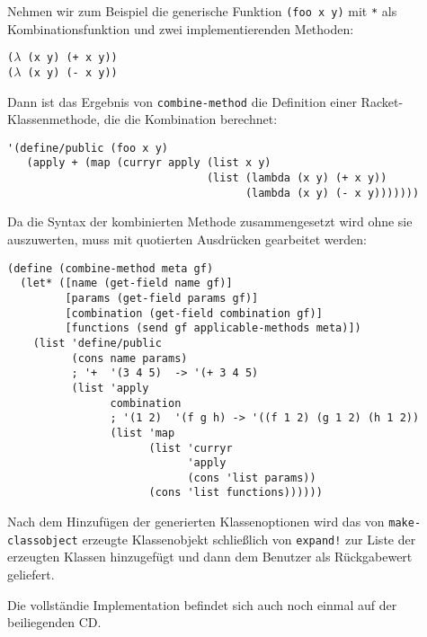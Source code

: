 Nehmen wir zum Beispiel die generische Funktion \texttt{(foo x y)} mit \texttt{*} als Kombinationsfunktion und zwei implementierenden Methoden:

\texttt{($\lambda$ (x y) (+ x y))\\
($\lambda$ (x y) (- x y))}

Dann ist das Ergebnis von \texttt{combine-method} die Definition einer Racket-Klassenmethode, die die Kombination berechnet:

\begin{lstlisting}
'(define/public (foo x y)
   (apply + (map (curryr apply (list x y)
                               (list (lambda (x y) (+ x y))
                                     (lambda (x y) (- x y)))))))
\end{lstlisting}

Da die Syntax der kombinierten Methode zusammengesetzt wird ohne sie auszuwerten, muss mit quotierten Ausdrücken gearbeitet werden:

\begin{lstlisting}
(define (combine-method meta gf)
  (let* ([name (get-field name gf)]
         [params (get-field params gf)]
         [combination (get-field combination gf)]
         [functions (send gf applicable-methods meta)])
    (list 'define/public
          (cons name params)
          ; '+  '(3 4 5)  -> '(+ 3 4 5)
          (list 'apply
                combination
                ; '(1 2)  '(f g h) -> '((f 1 2) (g 1 2) (h 1 2))
                (list 'map
                      (list 'curryr
                            'apply
                            (cons 'list params))
                      (cons 'list functions))))))
\end{lstlisting}

Nach dem Hinzufügen der generierten Klassenoptionen wird das von \texttt{make-classobject} erzeugte Klassenobjekt schließlich von \texttt{expand!} zur Liste der erzeugten Klassen hinzugefügt und dann dem Benutzer als Rückgabewert geliefert. 

Die vollständie Implementation befindet sich auch noch einmal auf der beiliegenden CD.